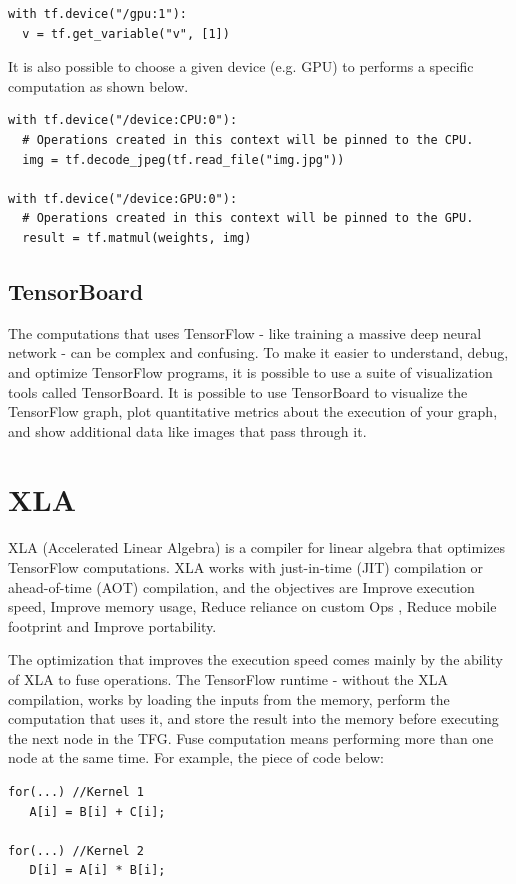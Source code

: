 \documentclass[11pt, fleqn]{article}
\begin{document}
\begin{verbatim}
with tf.device("/gpu:1"):
  v = tf.get_variable("v", [1])
\end{verbatim}

It is also possible to choose a given device (e.g. GPU) to performs a specific computation as shown below.

\begin{verbatim}
with tf.device("/device:CPU:0"):
  # Operations created in this context will be pinned to the CPU.
  img = tf.decode_jpeg(tf.read_file("img.jpg"))

with tf.device("/device:GPU:0"):
  # Operations created in this context will be pinned to the GPU.
  result = tf.matmul(weights, img)
\end{verbatim}

\subsection{TensorBoard}
The computations that uses TensorFlow - like training a massive deep neural network - can be complex and confusing. To make it easier to understand, debug, and optimize TensorFlow programs, it is possible to use a suite of visualization tools called TensorBoard. It is possible to use TensorBoard to visualize the TensorFlow graph, plot quantitative metrics about the execution of your graph, and show additional data like images that pass through it.
 

\section{XLA}

XLA (Accelerated Linear Algebra) is a compiler for linear algebra that optimizes TensorFlow computations. XLA works with just-in-time (JIT) compilation or ahead-of-time (AOT) compilation, and the objectives are Improve execution speed, Improve memory usage, Reduce reliance on custom Ops , Reduce mobile footprint and Improve portability.

The optimization that improves the execution speed comes mainly by the ability of XLA to fuse operations. The TensorFlow runtime - without the XLA compilation, works by loading the inputs from the memory, perform the computation that uses it, and store the result into the memory before executing the next node in the TFG. Fuse computation means performing more than one node at the same time. For example, the piece of code below: 

\begin{verbatim}
for(...) //Kernel 1
   A[i] = B[i] + C[i];

for(...) //Kernel 2
   D[i] = A[i] * B[i];
\end{verbatim} 
\end{document}
